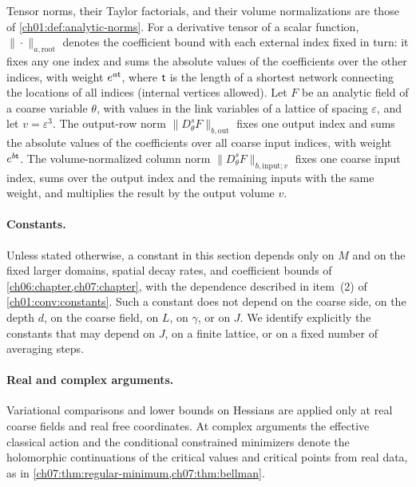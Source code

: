 Tensor norms, their Taylor factorials, and their volume normalizations are those of \cref{ch01:def:analytic-norms}. For a derivative tensor of a scalar function, $\|\cdot\|_{a,\mathrm{root}}$ denotes the coefficient bound with each external index fixed in turn: it fixes any one index and sums the absolute values of the coefficients over the other indices, with weight $e^{a\mathsf t}$, where $\mathsf t$ is the length of a shortest network connecting the locations of all indices (internal vertices allowed). Let $F$ be an analytic field of a coarse variable $\theta$, with values in the link variables of a lattice of spacing $\varepsilon$, and let $v=\varepsilon^3$. The output-row norm $\|D^s_\theta F\|_{b,\mathrm{out}}$ fixes one output index and sums the absolute values of the coefficients over all coarse input indices, with weight $e^{b\mathsf t}$. The volume-normalized column norm $\|D^s_\theta F\|_{b,\mathrm{input};v}$ fixes one coarse input index, sums over the output index and the remaining inputs with the same weight, and multiplies the result by the output volume $v$.

\paragraph{Constants.}
Unless stated otherwise, a constant in this section depends only on $M$ and on the fixed larger domains, spatial decay rates, and coefficient bounds of \cref{ch06:chapter,ch07:chapter}, with the dependence described in item~(2) of \cref{ch01:conv:constants}. Such a constant does not depend on the coarse side, on the depth $d$, on the coarse field, on $L$, on $\gamma$, or on $J$. We identify explicitly the constants that may depend on $J$, on a finite lattice, or on a fixed number of averaging steps.

\paragraph{Real and complex arguments.}
Variational comparisons and lower bounds on Hessians are applied only at real coarse fields and real free coordinates. At complex arguments the effective classical action and the conditional constrained minimizers denote the holomorphic continuations of the critical values and critical points from real data, as in \cref{ch07:thm:regular-minimum,ch07:thm:bellman}.

